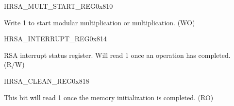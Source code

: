 \begin{register}{H}{RSA\_MULT\_START\_REG}{0x810}\label{regdesc:RSAMULTSTARTREG}
%
%
\regnewline%
\begin{regdesc}\begin{reglist}
\item [RSA\_MULT\_START]Write 1 to start modular multiplication or multiplication. (WO)
\end{reglist}\end{regdesc}
\end{register}


\begin{register}{H}{RSA\_INTERRUPT\_REG}{0x814}\label{regdesc:RSAINTERRUPTREG}
%
%
\regnewline%
\begin{regdesc}\begin{reglist}
\item [RSA\_INTERRUPT]RSA interrupt status register. Will read 1 once an operation has completed. (R/W)
\end{reglist}\end{regdesc}
\end{register}


\begin{register}{H}{RSA\_CLEAN\_REG}{0x818}\label{regdesc:RSACLEANREG}
%
%
\regnewline%
\begin{regdesc}\begin{reglist}
\item [RSA\_CLEAN]This bit will read 1 once the memory initialization is completed. (RO)
\end{reglist}\end{regdesc}
\end{register}

